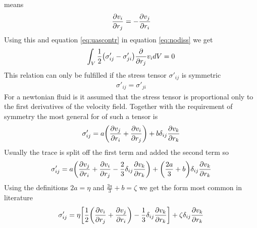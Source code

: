 means
\begin{align}
\ppd{r_j}{v_i} = -\ppd{r_i}{v_j}
\end{align}
Using this and equation \eqref{eq:uascontr} in equation \eqref{eq:nodiss} we get
\begin{align}
\int_V \frac{1}{2}\lra{\sigma'_{ij}-\sigma'_{ji}} \pd{r_j} v_i dV = 0
\end{align}
This relation can only be fulfilled if the stress tensor $\sigma'_{ij}$
is symmetric
\begin{align}
\sigma'_{ij} = \sigma'_{ji}
\end{align}
For a newtonian fluid is it assumed that the stress tensor is proportional only to the
first derivatives of the velocity field. Together with the requirement of symmetry
the most general for of such a tensor is
\begin{align}
\sigma'_{ij} = a\lra{\ppd{r_i}{v_j}+\ppd{r_j}{v_i}}+b \delta_{ij}\ppd{r_k}{v_k}
\end{align}
Usually the trace is split off the first term and added the second term so
\begin{align}
\sigma'_{ij} = a \lra{\ppd{r_i}{v_j}+\ppd{r_j}{v_i}
-\frac{2}{3}\delta_{ij}\ppd{r_k}{v_k}}+\lra{\frac{2 a}{3}+b}\delta_{ij}\ppd{r_k}{v_k}
\end{align}
Using the definitions $2a = \eta$ and $\frac{2 a}{3}+b=\zeta$ we get the form
most common in literature
\begin{align}
\sigma'_{ij} =  
\eta\lrb{\frac{1}{2}\lra{\ppd{r_j}{v_i}+\ppd{r_i}{v_j}}
-\frac{1}{3}\delta_{ij}\ppd{r_k}{v_k}}
+\zeta \delta_{ij}\ppd{r_k}{v_k}
\end{align}

